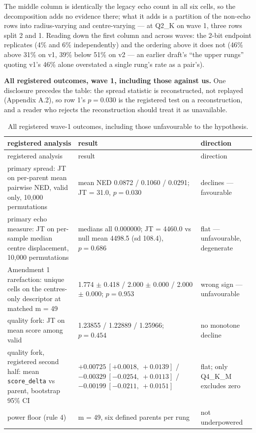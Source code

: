 The middle column is identically the legacy echo count in all six cells, so the decomposition adds no evidence there; what it adds is a partition of the non-echo rows into radius-varying and centre-varying --- at Q2\_K on wave 1, three rows split 2 and 1. Reading down the first column and across waves: the 2-bit endpoint replicates (4\% and 6\% independently) and the ordering above it does not (46\% above 31\% on v1, 39\% below 51\% on v2 --- an earlier draft's ``the upper rungs'' quoting v1's 46\% alone overstated a single rung's rate as a pair's).

\textbf{All registered outcomes, wave 1, including those against us.} One disclosure precedes the table: the spread statistic is reconstructed, not replayed (Appendix A.2), so row 1's $p = 0.030$ is the registered test on a reconstruction, and a reader who rejects the reconstruction should treat it as unavailable.

\clearpage
\begingroup
\footnotesize
\setlength{\LTpre}{0pt}
\begin{longtable}{p{4.3cm}p{6.3cm}p{3cm}}
\caption{All registered wave-1 outcomes, including those unfavourable to the
hypothesis.}\\
\toprule
registered analysis & result & direction \\
\midrule
\endfirsthead
\toprule
registered analysis & result & direction \\
\midrule
\endhead
\bottomrule
\endlastfoot
primary spread: JT on per-parent mean pairwise NED, valid only, 10,000 permutations & mean NED 0.0872 / 0.1060 / 0.0291; JT = 31.0, $p = 0.030$ & declines --- favourable \\
primary echo measure: JT on per-sample median centre displacement, 10,000 permutations & medians all 0.000000; JT = 4460.0 vs null mean 4498.5 (sd 108.4), $p = 0.686$ & flat --- unfavourable, degenerate \\
Amendment 1 rarefaction: unique cells on the centres-only descriptor at matched m = 49 & 1.774 $\pm$ 0.418 / 2.000 $\pm$ 0.000 / 2.000 $\pm$ 0.000; $p = 0.953$ & wrong sign --- unfavourable \\
quality fork: JT on mean score among valid & 1.23855 / 1.22889 / 1.25966; $p = 0.454$ & no monotone decline \\
quality fork, registered second half: mean \texttt{score\_delta} vs parent, bootstrap 95\% CI & $+0.00725\ [+0.0018,\ +0.0139]$ / $-0.00329\ [-0.0254,\ +0.0113]$ / $-0.00199\ [-0.0211,\ +0.0151]$ & flat; only Q4\_K\_M excludes zero \\
power floor (rule 4) & m = 49, six defined parents per rung & not underpowered \\
\end{longtable}
\endgroup

